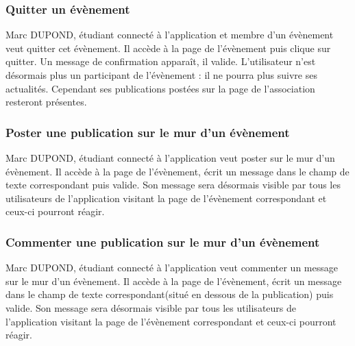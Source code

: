 \subsubsection*{Quitter un évènement}
Marc DUPOND, étudiant connecté à l’application et membre d’un évènement veut quitter cet évènement. Il accède à la page de l’évènement puis clique sur quitter. Un message de confirmation apparaît, il valide. L’utilisateur n’est désormais plus un participant de l’évènement : il ne pourra plus suivre ses actualités. Cependant ses publications postées sur la page de l’association resteront présentes.
\subsubsection*{Poster une publication sur le mur d’un évènement}
Marc DUPOND, étudiant connecté à l’application veut poster sur le mur d’un évènement. Il accède à la page de l’évènement, écrit un message dans le champ de texte correspondant puis valide. Son message sera désormais visible par tous les utilisateurs de l’application visitant la page de l’évènement correspondant et ceux-ci pourront réagir.
\subsubsection*{Commenter une publication sur le mur d’un évènement}
Marc DUPOND, étudiant connecté à l’application veut commenter un message sur le mur d’un évènement. Il accède à la page de l’évènement, écrit un message dans le champ de texte correspondant(situé en dessous de la publication) puis valide. Son message sera désormais visible par tous les utilisateurs de l’application visitant la page de l’évènement correspondant et ceux-ci pourront réagir.